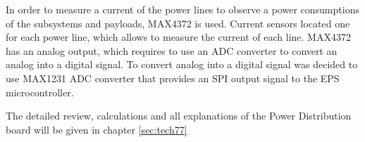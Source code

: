   In order to measure a current of the power lines to observe a power consumptions of the subsystems and payloads, MAX4372 is used. Current sensors located one for each power line, which allows to measure the current of each line. MAX4372 has an analog output, which requires to use an ADC converter to convert an analog into a digital signal. To convert analog into a digital signal was decided to use MAX1231 ADC converter that provides an SPI output signal to the EPS microcontroller. 
  
    
  The detailed review, calculations and all explanations of the Power Distribution board will be given in chapter \ref{sec:tech77}
  
    
  
    

    
  

  
  
  

